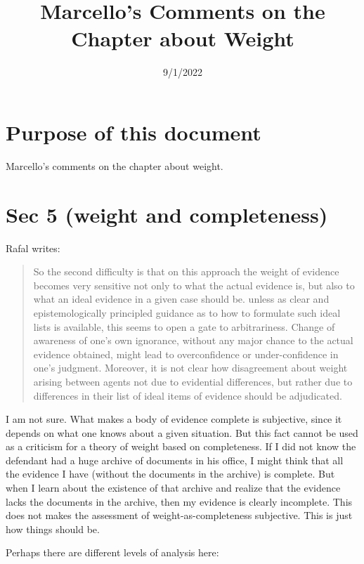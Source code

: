 \documentclass[
  10pt,
  dvipsnames,enabledeprecatedfontcommands]{scrartcl}
\title{Marcello's Comments on the Chapter about Weight}
\author{}
\date{\vspace{-2.5em}9/1/2022}
\begin{document}
\maketitle

\hypertarget{purpose-of-this-document}{%
\section{Purpose of this document}\label{purpose-of-this-document}}

Marcello's comments on the chapter about weight.

\hypertarget{sec-5-weight-and-completeness}{%
\section{Sec 5 (weight and
completeness)}\label{sec-5-weight-and-completeness}}

Rafal writes:

\begin{quote}
So the second difficulty is that on this approach the weight of evidence becomes very sensitive not only to what the actual evidence is, but also to what an ideal evidence in a given case should be. unless as clear and epistemologically principled guidance as to how to formulate such ideal lists is available, this seems to open a gate to arbitrariness. Change of awareness of one’s own ignorance, without any major chance to the actual evidence obtained, might lead to overconfidence or under-confidence in one’s judgment. Moreover, it is not clear how disagreement about weight arising between agents not due to evidential differences, but rather due to differences in their list of ideal items of evidence should be adjudicated.
\end{quote}

I am not sure. What makes a body of evidence complete is subjective,
since it depends on what one knows about a given situation. But this
fact cannot be used as a criticism for a theory of weight based on
completeness. If I did not know the defendant had a huge archive of
documents in his office, I might think that all the evidence I have
(without the documents in the archive) is complete. But when I learn
about the existence of that archive and realize that the evidence lacks
the documents in the archive, then my evidence is clearly incomplete.
This does not makes the assessment of weight-as-completeness subjective.
This is just how things should be.

Perhaps there are different levels of analysis here:
\end{document}

